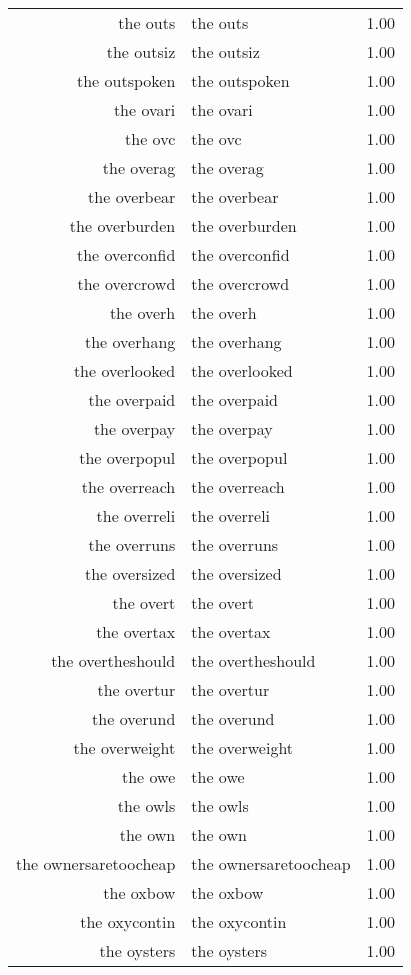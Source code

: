\begin{table}[ht]
\begin{tabular}{rlr}
  the outs & the outs & 1.00 \\ 
  the outsiz & the outsiz & 1.00 \\ 
  the outspoken & the outspoken & 1.00 \\ 
  the ovari & the ovari & 1.00 \\ 
  the ovc & the ovc & 1.00 \\ 
  the overag & the overag & 1.00 \\ 
  the overbear & the overbear & 1.00 \\ 
  the overburden & the overburden & 1.00 \\ 
  the overconfid & the overconfid & 1.00 \\ 
  the overcrowd & the overcrowd & 1.00 \\ 
  the overh & the overh & 1.00 \\ 
  the overhang & the overhang & 1.00 \\ 
  the overlooked & the overlooked & 1.00 \\ 
  the overpaid & the overpaid & 1.00 \\ 
  the overpay & the overpay & 1.00 \\ 
  the overpopul & the overpopul & 1.00 \\ 
  the overreach & the overreach & 1.00 \\ 
  the overreli & the overreli & 1.00 \\ 
  the overruns & the overruns & 1.00 \\ 
  the oversized & the oversized & 1.00 \\ 
  the overt & the overt & 1.00 \\ 
  the overtax & the overtax & 1.00 \\ 
  the overtheshould & the overtheshould & 1.00 \\ 
  the overtur & the overtur & 1.00 \\ 
  the overund & the overund & 1.00 \\ 
  the overweight & the overweight & 1.00 \\ 
  the owe & the owe & 1.00 \\ 
  the owls & the owls & 1.00 \\ 
  the own & the own & 1.00 \\ 
  the ownersaretoocheap & the ownersaretoocheap & 1.00 \\ 
  the oxbow & the oxbow & 1.00 \\ 
  the oxycontin & the oxycontin & 1.00 \\ 
  the oysters & the oysters & 1.00 \\ 

\end{tabular}
\end{table}
